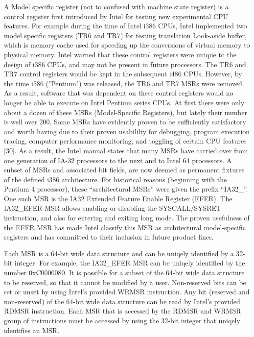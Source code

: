 \documentclass{report}
\begin{document}
\begin{spacing}{1.5}
{\large
A Model specific register (not to confused with machine state register) is a control register first introduced by Intel for testing new experimental CPU features. For example during the time of Intel i386 CPUs, Intel implemented two model specific registers (TR6 and TR7) for testing translation Look-aside buffer, which is memory cache used for speeding up the conversions of virtual memory to physical memory. Intel warned that these control registers were unique to the design of i386 CPUs, and may not be present in future processors. The TR6 and TR7 control registers would be kept in the subsequent i486 CPUs. However, by the time i586 ("Pentium") was released, the TR6 and TR7 MSRs were removed. As a result, software that was dependent on these control registers would no longer be able to execute on Intel Pentium series CPUs. At first there were only about a dozen of these MSRs (Model-Specific Registers), but lately their number is well over 200. Some MSRs have evidently proven to be sufficiently satisfactory and worth having due to their proven usabililty for debugging, program execution tracing, computer performance monitoring, and toggling of certain CPU features [30]. As a result, the Intel manual states that many MSRs have carried over from one generation of IA-32 processors to the next and to Intel 64 processors. A subset of MSRs and associated bit fields, are now deemed as permanent fixtures of the defined i386 architecture. For historical reasons (beginning with the Pentium 4 processor), these “architectural MSRs” were given the prefix “IA32\_”. One such MSR is the IA32 Extended Feature Enable Register (EFER). The IA32\_EFER MSR allows enabling or disabling the SYSCALL/SYSRET instruction, and also for entering and exiting long mode. The proven usefulness of the EFER MSR has made Intel classify this MSR as architectural model-specific registers and has committed to their inclusion in future product lines.
\newline
}

{\large
Each MSR is a 64-bit wide data structure and can be uniqely identified by a 32-bit integer. For example, the IA32\_EFER MSR can be uniqely identified by the number 0xC0000080. It is possible for a subset of the 64-bit wide data structure to be reserved, so that it cannot be modified by a user. Non-reserved bits can be set or unset by using Intel's provided WRMSR instruction. Any bit (reserved and non-reserved) of the 64-bit wide data structure can be read by Intel's provided RDMSR instruction. Each MSR that is accessed by the RDMSR and WRMSR group of instructions must be accessed by using the 32-bit integer that uniqely identifies an MSR.
\newline
}



\end{spacing}
\end{document}
